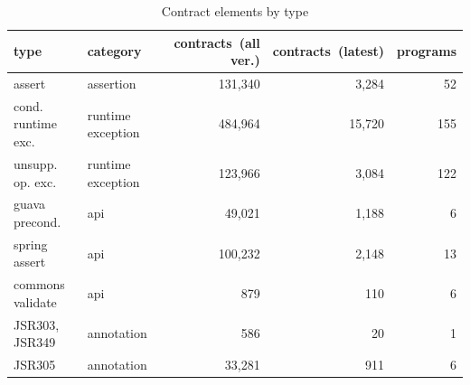 \begin{table}[]
\centering
\caption{Contract elements by type}
\label{tab:contractsbytype}
\begin{tabular}{|p{5cm}|p{3cm}|r|r|r|} \hline
   type & category & \parbox{1.2cm}{contracts\ (all ver.)}  & \parbox{1.2cm}{contracts\ (latest)} & pro\-grams \\ \hline
	assert &  assertion &  131,340 &  3,284 &  52 \\ 
	cond. runtime exc. &  runtime exception &  484,964 &  15,720 &  155 \\ 
	unsupp. op. exc. &  runtime exception &  123,966 &  3,084 &  122 \\ 
	guava precond. &  api &  49,021 &  1,188 &  6 \\ 
	spring assert &  api &  100,232 &  2,148 &  13 \\ 
	commons validate &  api &  879 &  110 &  6 \\ 
	JSR303, JSR349 &  annotation &  586 &  20 &  1 \\ 
	JSR305 &  annotation &  33,281 &  911 &  6 \\ 
\hline
\end{tabular}
\end{table}
